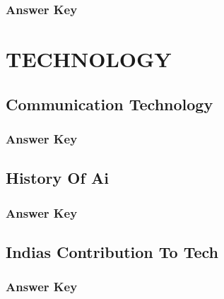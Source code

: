 \documentclass[12pt,a4paper]{book}
\newcounter{totalcounter}
\begin{document}


\subsection*{Answer Key}



\chapter{TECHNOLOGY}

\setcounter{totalcounter}{1}

\section{Communication Technology}



\subsection*{Answer Key}



\setcounter{totalcounter}{1}

\section{History Of Ai}



\subsection*{Answer Key}



\setcounter{totalcounter}{1}

\section{Indias Contribution To Tech}



\subsection*{Answer Key}
\end{document}
